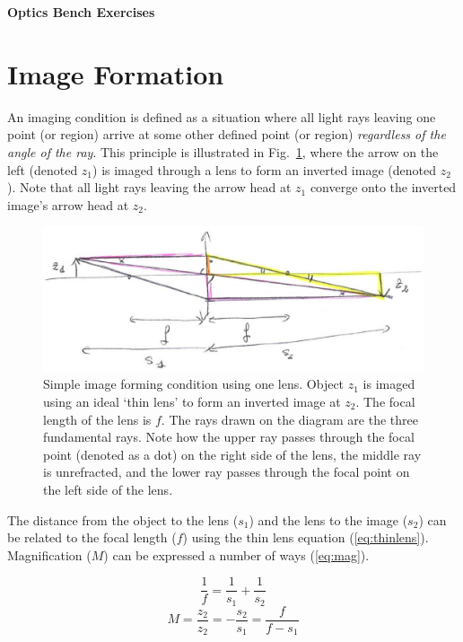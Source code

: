 \documentclass[a4paper]{report}
\begin{document}
\setcounter{secnumdepth}{2}

\begin{center}
\textbf{\Large{Optics Bench Exercises}}
\end{center}



\section{Image Formation}
An imaging condition is defined as a situation where all light rays
leaving one point (or region) arrive at some other defined point (or
region) \textit{regardless of the angle of the ray}. This principle is
illustrated in Fig.~\ref{onelens}, where the arrow on the left
(denoted $z_1$) is imaged through a lens to form an inverted image
(denoted $z_2$). Note that all light rays leaving the arrow head at
$z_1$ converge onto the inverted image's arrow head at $z_2$. 


\begin{figure}[h]
\center
\includegraphics[width=5in]{oneLens.eps}
\caption{Simple image forming condition using one lens. Object $z_1$
  is imaged using an ideal `thin lens' to form an inverted image at
  $z_2$. The focal length of the lens is $f$. The rays drawn on the
  diagram are the three fundamental rays. Note how the upper ray
  passes through the focal point (denoted as a dot) on the right side
  of the lens, the middle ray is unrefracted, and the lower ray passes
  through the focal point on the left side of the lens. }
\label{onelens}
\end{figure}


The distance from the object to the lens ($s_1$) and the lens to the
image ($s_2$) can be related to the focal length ($f$) using the thin
lens equation (\ref{eq:thinlens}). Magnification ($M$) can be
expressed a number of ways (\ref{eq:mag}).

\begin{equation}
\frac{1}{f}=\frac{1}{s_1}+\frac{1}{s_2}
\label{eq:thinlens}
\end{equation}
\begin{equation}
M=\frac{z_2}{z_2}=-\frac{s_2}{s_1}=\frac{f}{f-s_1}
\label{eq:mag}
\end{equation}
\end{document}
